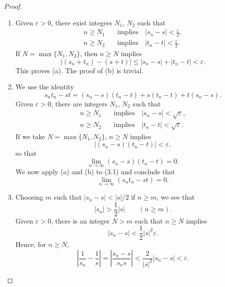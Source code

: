 \begin{proof}
\begin{enumerate}[label=(\alph*), leftmargin=2.2em, itemsep=4pt, topsep=3pt]
  \item Given $\varepsilon > 0$, there exist integers $N_1$, $N_2$ such that
        \begin{align*}
          n \ge N_1 &\quad\text{implies}\quad |s_n-s| < \frac{\varepsilon}{2},\\
          n \ge N_2 &\quad\text{implies}\quad |t_n-t| < \frac{\varepsilon}{2}.
        \end{align*}
        If $N = \max\{N_1,N_2\}$, then $n \ge N$ implies
        \[ |(s_n+t_n)-(s+t)| \le |s_n-s| + |t_n-t| < \varepsilon. \]
        This proves (a). The proof of (b) is trivial.
  \item[(c)] We use the identity
        \begin{equation}
          s_nt_n - st = (s_n-s)(t_n-t) + s(t_n-t) + t(s_n-s). \tag{3.1}
        \end{equation}
        Given $\varepsilon > 0$, there are integers $N_1$, $N_2$ such that
        \begin{align*}
          n \ge N_1 &\quad\text{implies}\quad |s_n-s| < \sqrt{\varepsilon},\\
          n \ge N_2 &\quad\text{implies}\quad |t_n-t| < \sqrt{\varepsilon}.
        \end{align*}
        If we take $N = \max\{N_1,N_2\}$, $n \ge N$ implies
        \[ |(s_n-s)(t_n-t)| < \varepsilon, \]
        so that
        \[ \lim_{n\to\infty} (s_n-s)(t_n-t) = 0. \]
        We now apply (a) and (b) to (3.1) and conclude that
        \[ \lim_{n\to\infty} (s_nt_n - st) = 0. \]
  \item[(d)] Choosing $m$ such that $|s_n-s| < |s|/2$ if $n \ge m$, we see
        that
        \[ |s_n| > \frac12|s| \qquad (n \ge m). \]
        Given $\varepsilon > 0$, there is an integer $N > m$ such that
        $n \ge N$ implies
        \[ |s_n-s| < \frac12|s|^2\varepsilon. \]
        Hence, for $n \ge N$,
        \[ \left|\frac{1}{s_n}-\frac{1}{s}\right|
           = \left|\frac{s_n-s}{s_ns}\right|
           < \frac{2}{|s|^2}|s_n-s| < \varepsilon. \]
\end{enumerate}
\end{proof}

